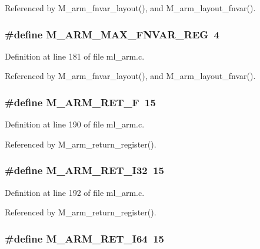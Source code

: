 Referenced by M\_\-arm\_\-fnvar\_\-layout(), and M\_\-arm\_\-layout\_\-fnvar().
\subsubsection{\setlength{\rightskip}{0pt plus 5cm}\#define M\_\-ARM\_\-MAX\_\-FNVAR\_\-REG~4}\label{ml__arm_8c_62356d20ccb81cc5cd59dcc8a5b04744}




Definition at line 181 of file ml\_\-arm.c.

Referenced by M\_\-arm\_\-fnvar\_\-layout(), and M\_\-arm\_\-layout\_\-fnvar().
\subsubsection{\setlength{\rightskip}{0pt plus 5cm}\#define M\_\-ARM\_\-RET\_\-F~15}\label{ml__arm_8c_965008278b4d19816cf20643cc1f080d}




Definition at line 190 of file ml\_\-arm.c.

Referenced by M\_\-arm\_\-return\_\-register().
\subsubsection{\setlength{\rightskip}{0pt plus 5cm}\#define M\_\-ARM\_\-RET\_\-I32~15}\label{ml__arm_8c_723ff374e312029b380a078650acd8a7}




Definition at line 192 of file ml\_\-arm.c.

Referenced by M\_\-arm\_\-return\_\-register().
\subsubsection{\setlength{\rightskip}{0pt plus 5cm}\#define M\_\-ARM\_\-RET\_\-I64~15}\label{ml__arm_8c_102c10a5688612a30c94f20dbb18b2ec}




